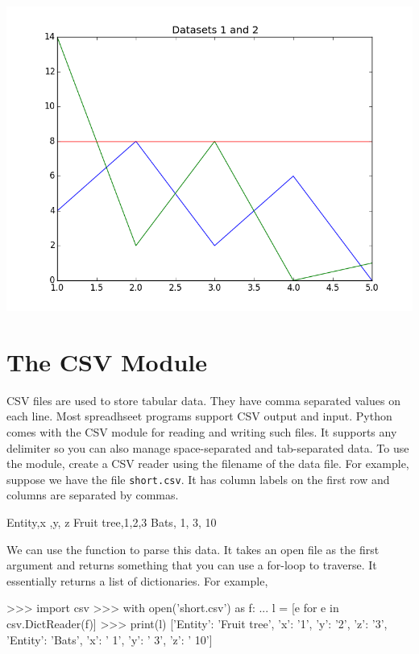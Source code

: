 \documentclass[11pt]{cselabheader}
\begin{document}
\begin{center}
\includegraphics[width=\textwidth]{img/matplotlib_overlayed.png}
\end{center}

\section{The CSV Module}
CSV files are used to store tabular data. They have comma separated values on
each line. Most spreadhseet programs support CSV output and input. Python comes
with the CSV module for reading and writing such files. It supports any
delimiter so you can also manage space-separated and tab-separated data. To
use the module, create a CSV reader using the filename of the data file. For
example, suppose we have the file \texttt{short.csv}. It has column labels
on the first row and columns are separated by commas.

\begin{verbatimcode}
Entity,x         ,y,  z
Fruit tree,1,2,3
Bats, 1, 3, 10
\end{verbatimcode}

We can use the  function to parse this data.
It takes an open file as the first argument and returns something that you
can use a for-loop to traverse. It essentially returns a list of dictionaries.
For example,

\begin{pyconcode}
>>> import csv
>>> with open('short.csv') as f:
...     l = [e for e in csv.DictReader(f)]
>>> print(l)
[{'Entity': 'Fruit tree', 'x': '1', 'y': '2', 'z': '3'},
 {'Entity': 'Bats', 'x': ' 1', 'y': ' 3', 'z': ' 10'}]
\end{pyconcode}
\end{document}
